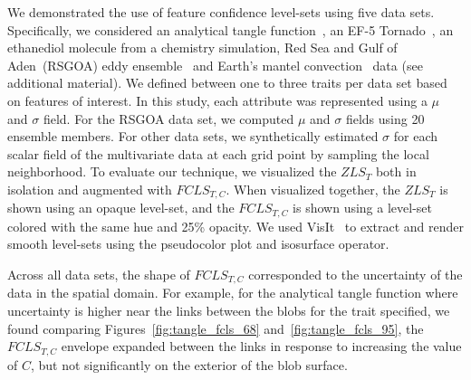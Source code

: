 %


%
%
We demonstrated the use of feature confidence level-sets using five data sets.
%
Specifically, we considered an analytical tangle function~\cite{knoll2009fast}, an EF-5 Tornado~\cite{atmos10100578}, an ethanediol molecule from a chemistry simulation, Red Sea and Gulf of Aden~(RSGOA) eddy ensemble~\cite{sanikommu2020impact} and Earth's mantel convection~\cite{shahnas2017mid} data (see additional material).
%
We defined between one to three traits per data set based on features of interest. 
%
%
In this study, each attribute was represented using a ${\mu}$ and ${\sigma}$ field. 
%
For the RSGOA data set, we computed ${\mu}$ and ${\sigma}$ fields using 20 ensemble members. 
%
For other data sets, we synthetically estimated ${\sigma}$ for each scalar field of the multivariate data at each grid point by sampling the local neighborhood.
%
To evaluate our technique, we visualized the $ZLS_{T}$ both in isolation and augmented with $FCLS_{T,C}$. 
%
When visualized together, the $ZLS_{T}$ is shown using an opaque level-set, and the $FCLS_{T,C}$ is shown using a level-set colored with the same hue and 25\% opacity.
%
We used VisIt~\cite{childs2012visit} to extract and render smooth level-sets using the pseudocolor plot and isosurface operator.

%

%
%
Across all data sets, the shape of $FCLS_{T,C}$ corresponded to the uncertainty of the data in the spatial domain.
%
For example, for the analytical tangle function where uncertainty is higher near the links between the blobs for the trait specified, we found comparing Figures~\ref{fig:tangle_fcls_68} and~\ref{fig:tangle_fcls_95}, the $FCLS_{T,C}$ envelope expanded between the links in response to increasing the value of $C$, but not significantly on the exterior of the blob surface.
%

